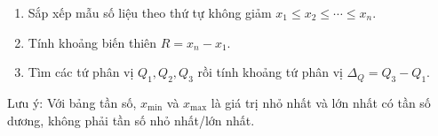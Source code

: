 \begin{enumerate}
\item Sắp xếp mẫu số liệu theo thứ tự không giảm $x_1 \le x_2 \le \cdots \le x_n$.
\item Tính khoảng biến thiên $R = x_n - x_1$.
\item Tìm các tứ phân vị $Q_1, Q_2, Q_3$ rồi tính khoảng tứ phân vị $\Delta_Q = Q_3 - Q_1$.
\end{enumerate}
Lưu ý: Với bảng tần số, $x_{\min}$ và $x_{\max}$ là giá trị nhỏ nhất và lớn nhất có tần số dương, không phải tần số nhỏ nhất/lớn nhất.
